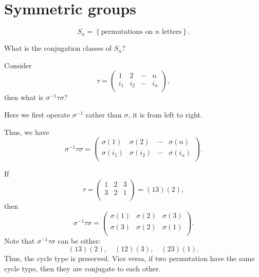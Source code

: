 \section{Symmetric groups}
\begin{definition}
    \[
        S_n = \left\{ \text{permutations on } n\text{ letters}  \right\}. 
    \]
\end{definition}

\begin{question}
    What is the conjugation classes of \(S_n\)? 
\end{question}

Consider 
\[
    \tau = \begin{pmatrix}
        1 & 2 & \cdots & n  \\
        i_1 & i_2 & \cdots & i_n  \\
    \end{pmatrix},
\]
then what is \(\sigma ^{-1} \tau \sigma \)?

\begin{note}
    Here we first operate \(\sigma ^{-1}\) rather than \(\sigma \), it is from left to right. 
\end{note}

Thus, we have 
\[
    \sigma ^{-1} \tau \sigma = \begin{pmatrix}
        \sigma (1) & \sigma (2) & \cdots & \sigma (n)  \\
        \sigma (i_1) & \sigma (i_2) & \cdots & \sigma (i_n)  \\
    \end{pmatrix}.
\]

\begin{eg}
    If 
    \[
        \tau = \begin{pmatrix}
            1 & 2 & 3  \\
            3 & 2 & 1  \\
        \end{pmatrix} = (13)(2),
    \] then 
    \[
        \sigma ^{-1} \tau \sigma = \begin{pmatrix}
            \sigma (1) & \sigma (2) & \sigma (3)  \\
            \sigma (3) & \sigma (2) & \sigma (1)  \\
        \end{pmatrix}.
    \]
    Note that \(\sigma ^{-1} \tau \sigma \) can be either:
    \[
        (13)(2), \quad (12)(3), \quad (23)(1).
    \] Thus, the cycle type is preserved. Vice versa, if two permutation have the same cycle type, then they are conjugate to each other.
\end{eg}

